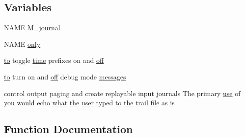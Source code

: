 \subsection*{Variables}
\begin{DoxyCompactItemize}
\item 
N\+A\+ME \hyperlink{M__journal_83_8txt_aba3a4e3e5bac44e7e807c3472bb2af91}{M\+\_\+journal}
\item 
N\+A\+ME \hyperlink{M__journal_83_8txt_a22c3378cbcd6f468bf7f38bb18fa456d}{only}
\item 
\hyperlink{M__stopwatch_83_8txt_a97209fd3e34ef701c0a9734280779cbb}{to} toggle \hyperlink{M__stopwatch_83_8txt_a1091fdf3a4e66042d1571c7e4ade98dd}{time} prefixes on and \hyperlink{M__journal_83_8txt_aa2578e680a7580a9d4666b72a93e6a53}{off}
\item 
\hyperlink{M__stopwatch_83_8txt_a97209fd3e34ef701c0a9734280779cbb}{to} turn on and \hyperlink{M__journal_83_8txt_aa2578e680a7580a9d4666b72a93e6a53}{off} debug mode \hyperlink{M__journal_83_8txt_a5eba9a740074bb5543b282f824b639f7}{messages}
\item 
control output paging and create replayable input journals The primary \hyperlink{intro__blas1_83_8txt_a04fa2694d85f67a675bb3f45f7241f48}{use} of you would echo \hyperlink{what__overview_81_8txt_adadc702e2a3423fa136bfa5b1e01b511}{what} \hyperlink{M__stopwatch_83_8txt_a0f266597de2e57eb3aa964927bb30e14}{the} \hyperlink{M__stopwatch_83_8txt_ae5f4c36a1ae7eba7900823c418223f72}{user} typed \hyperlink{M__stopwatch_83_8txt_a97209fd3e34ef701c0a9734280779cbb}{to} \hyperlink{M__stopwatch_83_8txt_a0f266597de2e57eb3aa964927bb30e14}{the} trail \hyperlink{what__overview_81_8txt_a447b56c526e8da30e0dc94673727ee25}{file} as \hyperlink{M__journal_83_8txt_af78cd777fb46433462e3afacb9c375fd}{is}
\end{DoxyCompactItemize}


\subsection{Function Documentation}
\mbox{\label{M__journal_83_8txt_afce72651d1eed785a2132bee863b2f38}} 
